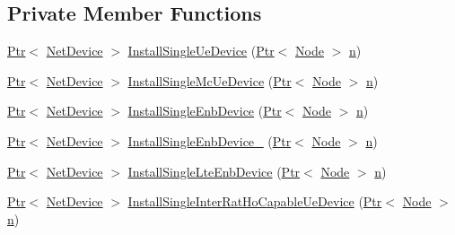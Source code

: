 \subsection*{Private Member Functions}
\begin{DoxyCompactItemize}
\item 
\hyperlink{classns3_1_1Ptr}{Ptr}$<$ \hyperlink{classns3_1_1NetDevice}{Net\+Device} $>$ \hyperlink{classns3_1_1MmWaveHelper_a2a37293b8b5542851f3c74cec20d44df}{Install\+Single\+Ue\+Device} (\hyperlink{classns3_1_1Ptr}{Ptr}$<$ \hyperlink{classns3_1_1Node}{Node} $>$ \hyperlink{lte__link__budget__x2__handover__measures_8m_abdb05bc5a064cf642a06c83b3392f148}{n})
\item 
\hyperlink{classns3_1_1Ptr}{Ptr}$<$ \hyperlink{classns3_1_1NetDevice}{Net\+Device} $>$ \hyperlink{classns3_1_1MmWaveHelper_a236cf69b7851d5bdf0c532c47dd19bd5}{Install\+Single\+Mc\+Ue\+Device} (\hyperlink{classns3_1_1Ptr}{Ptr}$<$ \hyperlink{classns3_1_1Node}{Node} $>$ \hyperlink{lte__link__budget__x2__handover__measures_8m_abdb05bc5a064cf642a06c83b3392f148}{n})
\item 
\hyperlink{classns3_1_1Ptr}{Ptr}$<$ \hyperlink{classns3_1_1NetDevice}{Net\+Device} $>$ \hyperlink{classns3_1_1MmWaveHelper_a3198d03edd662d9d9e46f5895f0217db}{Install\+Single\+Enb\+Device} (\hyperlink{classns3_1_1Ptr}{Ptr}$<$ \hyperlink{classns3_1_1Node}{Node} $>$ \hyperlink{lte__link__budget__x2__handover__measures_8m_abdb05bc5a064cf642a06c83b3392f148}{n})
\item 
\hyperlink{classns3_1_1Ptr}{Ptr}$<$ \hyperlink{classns3_1_1NetDevice}{Net\+Device} $>$ \hyperlink{classns3_1_1MmWaveHelper_a9e8fdb55ce66ac62798d0707edb9d871}{Install\+Single\+Enb\+Device\+\_} (\hyperlink{classns3_1_1Ptr}{Ptr}$<$ \hyperlink{classns3_1_1Node}{Node} $>$ \hyperlink{lte__link__budget__x2__handover__measures_8m_abdb05bc5a064cf642a06c83b3392f148}{n})
\item 
\hyperlink{classns3_1_1Ptr}{Ptr}$<$ \hyperlink{classns3_1_1NetDevice}{Net\+Device} $>$ \hyperlink{classns3_1_1MmWaveHelper_aaeb59f78f5681d696fe4b3ddea022406}{Install\+Single\+Lte\+Enb\+Device} (\hyperlink{classns3_1_1Ptr}{Ptr}$<$ \hyperlink{classns3_1_1Node}{Node} $>$ \hyperlink{lte__link__budget__x2__handover__measures_8m_abdb05bc5a064cf642a06c83b3392f148}{n})
\item 
\hyperlink{classns3_1_1Ptr}{Ptr}$<$ \hyperlink{classns3_1_1NetDevice}{Net\+Device} $>$ \hyperlink{classns3_1_1MmWaveHelper_ab39af31d58b43a27347c95ef8f999591}{Install\+Single\+Inter\+Rat\+Ho\+Capable\+Ue\+Device} (\hyperlink{classns3_1_1Ptr}{Ptr}$<$ \hyperlink{classns3_1_1Node}{Node} $>$ \hyperlink{lte__link__budget__x2__handover__measures_8m_abdb05bc5a064cf642a06c83b3392f148}{n})

\end{DoxyCompactItemize}

